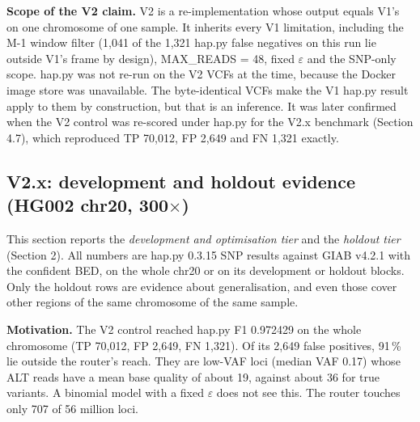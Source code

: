 \documentclass[11pt,a4paper]{article}
\makeatletter
\newcommand{\needspace}[1]{\par\ifdim\pagegoal=\maxdimen\else\dimen@=\pagegoal\advance\dimen@-\pagetotal\ifdim\dimen@<#1\relax\newpage\fi\fi}
\makeatother
\begin{document}
\textbf{Scope of the V2 claim.} V2 is a re-implementation whose output equals V1's on one chromosome of one sample. It inherits every V1 limitation, including the M-1 window filter (1,041 of the 1,321 hap.py false negatives on this run lie outside V1's frame by design), MAX\_READS = 48, fixed $\varepsilon$ and the SNP-only scope. hap.py was not re-run on the V2 VCFs at the time, because the Docker image store was unavailable. The byte-identical VCFs make the V1 hap.py result apply to them by construction, but that is an inference. It was later confirmed when the V2 control was re-scored under hap.py for the V2.x benchmark (Section 4.7), which reproduced TP 70,012, FP 2,649 and FN 1,321 exactly.

\needspace{6\baselineskip}
\subsection{\texorpdfstring{V2.x: development and holdout evidence (HG002 chr20, 300$\times$)}{V2.x: development and holdout evidence (HG002 chr20, 300x)}}
This section reports the \emph{development and optimisation tier} and the \emph{holdout tier} (Section 2). All numbers are hap.py 0.3.15 SNP results against GIAB v4.2.1 with the confident BED, on the whole chr20 or on its development or holdout blocks. Only the holdout rows are evidence about generalisation, and even those cover other regions of the same chromosome of the same sample.

\textbf{Motivation.} The V2 control reached hap.py F1 0.972429 on the whole chromosome (TP 70,012, FP 2,649, FN 1,321). Of its 2,649 false positives, 91\,\% lie outside the router's reach. They are low-VAF loci (median VAF 0.17) whose ALT reads have a mean base quality of about 19, against about 36 for true variants. A binomial model with a fixed $\varepsilon$ does not see this. The router touches only 707 of 56 million loci.
\end{document}
